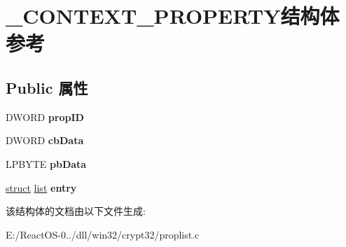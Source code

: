 \hypertarget{struct___c_o_n_t_e_x_t___p_r_o_p_e_r_t_y}{}\section{\+\_\+\+C\+O\+N\+T\+E\+X\+T\+\_\+\+P\+R\+O\+P\+E\+R\+T\+Y结构体 参考}
\label{struct___c_o_n_t_e_x_t___p_r_o_p_e_r_t_y}
\subsection*{Public 属性}
\begin{DoxyCompactItemize}
\item 
\mbox{\label{struct___c_o_n_t_e_x_t___p_r_o_p_e_r_t_y_aee48c19221aa4ad1a968f1c5c33aebcc}} 
D\+W\+O\+RD {\bfseries prop\+ID}
\item 
\mbox{\label{struct___c_o_n_t_e_x_t___p_r_o_p_e_r_t_y_a46e37407fce9a8515ea4acc374584f52}} 
D\+W\+O\+RD {\bfseries cb\+Data}
\item 
\mbox{\label{struct___c_o_n_t_e_x_t___p_r_o_p_e_r_t_y_ad704d7daeda39ae96ccdc36de29f83fb}} 
L\+P\+B\+Y\+TE {\bfseries pb\+Data}
\item 
\mbox{\label{struct___c_o_n_t_e_x_t___p_r_o_p_e_r_t_y_a644fe11123f1ddb5606a405466838591}} 
\hyperlink{interfacestruct}{struct} \hyperlink{classlist}{list} {\bfseries entry}
\end{DoxyCompactItemize}


该结构体的文档由以下文件生成\+:\begin{DoxyCompactItemize}
\item 
E\+:/\+React\+O\+S-\/0../dll/win32/crypt32/proplist.\+c\end{DoxyCompactItemize}
